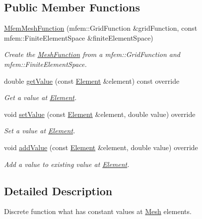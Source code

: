\subsection*{Public Member Functions}
\begin{DoxyCompactItemize}
\item 
\hyperlink{classraytracer_1_1MfemMeshFunction_a92a9d86fa4b15e3514e15ad50d534bf6}{Mfem\+Mesh\+Function} (mfem\+::\+Grid\+Function \&grid\+Function, const mfem\+::\+Finite\+Element\+Space \&finite\+Element\+Space)
\begin{DoxyCompactList}\small\item\em Create the \hyperlink{classraytracer_1_1MeshFunction}{Mesh\+Function} from a mfem\+::\+Grid\+Function and mfem\+::\+Finite\+Element\+Space. \end{DoxyCompactList}\item 
double \hyperlink{classraytracer_1_1MfemMeshFunction_a3e7183c2cca55df6115176d1d9030846}{get\+Value} (const \hyperlink{classraytracer_1_1Element}{Element} \&element) const override
\begin{DoxyCompactList}\small\item\em Get a value at \hyperlink{classraytracer_1_1Element}{Element}. \end{DoxyCompactList}\item 
void \hyperlink{classraytracer_1_1MfemMeshFunction_aa7c06ea3f585a45573174b073da58ee1}{set\+Value} (const \hyperlink{classraytracer_1_1Element}{Element} \&element, double value) override
\begin{DoxyCompactList}\small\item\em Set a value at \hyperlink{classraytracer_1_1Element}{Element}. \end{DoxyCompactList}\item 
void \hyperlink{classraytracer_1_1MfemMeshFunction_a1c9f0ec943afb1d069ddeb85ee9bb2c8}{add\+Value} (const \hyperlink{classraytracer_1_1Element}{Element} \&element, double value) override
\begin{DoxyCompactList}\small\item\em Add a value to existing value at \hyperlink{classraytracer_1_1Element}{Element}. \end{DoxyCompactList}\end{DoxyCompactItemize}


\subsection{Detailed Description}
Discrete function what has constant values at \hyperlink{classraytracer_1_1Mesh}{Mesh} elements. 

